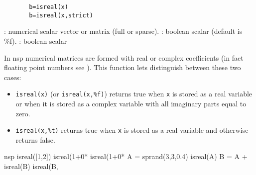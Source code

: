 


\begin{mandesc}
\end{mandesc}


\begin{calling_sequence}
    \begin{verbatim}
       b=isreal(x)  
       b=isreal(x,strict)  
    \end{verbatim}
\end{calling_sequence}

\begin{parameters}
  \begin{varlist}
   : numerical scalar vector or matrix (full or sparse).
   : boolean scalar (default is \%f).
   : boolean scalar
  \end{varlist}
\end{parameters}

\begin{mandescription}
In nsp numerical matrices are formed with real or complex coefficients
(in fact floating point numbers see
). This function
lets distinguish between these two cases:
\begin{itemize}
\item \verb!isreal(x)! (or \verb!isreal(x,%f)!) returns true when 
\verb!x! is stored as a real variable or when it is stored 
as a complex variable with all imaginary parts equal to zero. 
\item \verb!isreal(x,%t)! returns true when \verb!x! is stored as a real
variable and otherwise returns false.
\end{itemize}

\end{mandescription}

\begin{examples}
  \begin{mintednsp}{nsp}
    isreal([1,2])
    isreal(1+0*%
    isreal(1+0*%
    A = sprand(3,3,0.4)
    isreal(A)
    B = A + %
    isreal(B)
    isreal(B,%
  \end{mintednsp}
\end{examples}


